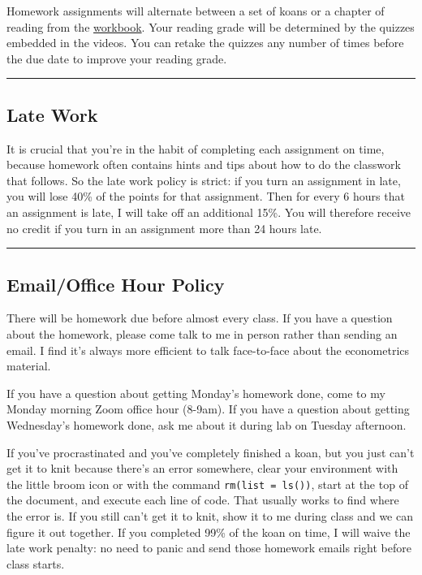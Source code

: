 \documentclass[11pt]{article}
\begin{document}
Homework assignments will alternate between a set of koans or a chapter of reading from the \href{https://colleen.quarto.pub/the-tidy-econometrics-workbook/}{workbook}. Your reading grade will be determined by the quizzes embedded in the videos. You can retake the quizzes any number of times before the due date to improve your reading grade.

\noindent\rule{\textwidth}{0.5pt}

\subsection*{Late Work}
\label{sec:org9d21434}

It is crucial that you're in the habit of completing each assignment on time, because homework often contains hints and tips about how to do the classwork that follows. So the late work policy is strict: if you turn an assignment in late, you will lose 40\% of the points for that assignment. Then for every 6 hours that an assignment is late, I will take off an additional 15\%. You will therefore receive no credit if you turn in an assignment more than 24 hours late.

\noindent\rule{\textwidth}{0.5pt}

\subsection*{Email/Office Hour Policy}
\label{sec:org8ccf1ba}

There will be homework due before almost every class. If you have a question about the homework, please come talk to me in person rather than sending an email. I find it's always more efficient to talk face-to-face about the econometrics material.

If you have a question about getting Monday's homework done, come to my Monday morning Zoom office hour (8-9am). If you have a question about getting Wednesday's homework done, ask me about it during lab on Tuesday afternoon.

If you've procrastinated and you've completely finished a koan, but you just can't get it to knit because there's an error somewhere, clear your environment with the little broom icon or with the command \texttt{rm(list = ls())}, start at the top of the document, and execute each line of code. That usually works to find where the error is. If you still can't get it to knit, show it to me during class and we can figure it out together. If you completed 99\% of the koan on time, I will waive the late work penalty: no need to panic and send those homework emails right before class starts.
\end{document}
